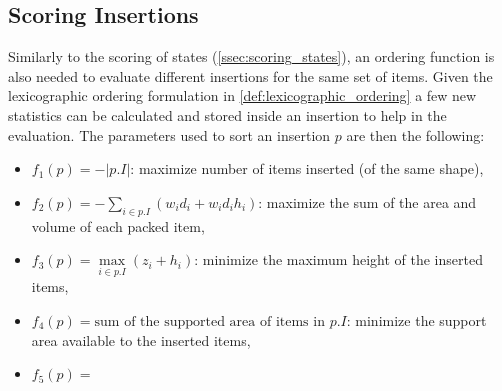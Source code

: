 \subsection{Scoring Insertions}
\label{ssec:scoring_insertions}%
Similarly to the scoring of states (\cref{ssec:scoring_states}), an ordering function is also needed to evaluate different insertions for the same set of items.
Given the lexicographic ordering formulation in \cref{def:lexicographic_ordering} a few new statistics can be calculated and stored inside an insertion to help in the evaluation.
The parameters used to sort an insertion $p$ are then the following:
\begin{itemize}
    \item $f_1(p) = -|p.I|$: maximize number of items inserted (of the same shape),
    \item $f_2(p) = -\sum\limits_{i \in p.I}{(w_i d_i + w_i d_i h_i)}$: maximize the sum of the area and volume of each packed item,
    \item $f_3(p) = \max\limits_{i \in p.I}(z_i + h_i)$: minimize the maximum height of the inserted items,
    \item $f_4(p) = \text{sum of the supported area of items in $p.I$}$: minimize the support area available to the inserted items,
    \item $f_5(p) = $
\end{itemize}
